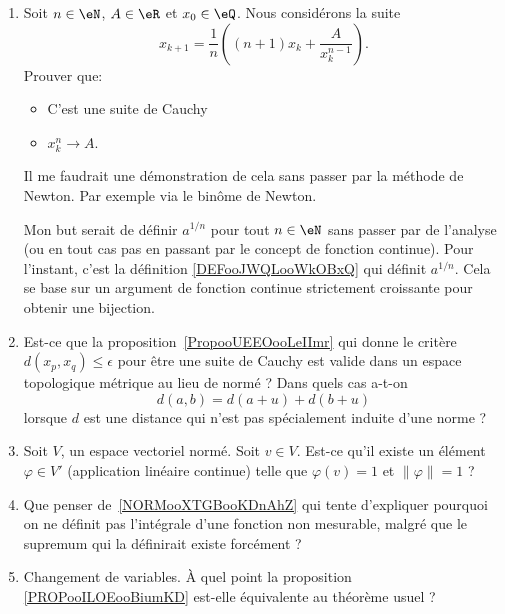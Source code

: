 \begin{enumerate}
    \item
        Soit \( n\in \eN\), \( A\in \eR\) et \( x_0\in \eQ\). Nous considérons la suite\cite{BIBooMPXEooQLKhku}
        \begin{equation}
            x_{k+1}=\frac{1}{ n }\left( (n+1)x_k+\frac{ A }{ x_k^{n-1} } \right).
        \end{equation}
        Prouver que:
        \begin{itemize}
            \item C'est une suite de Cauchy
            \item \( x_k^n\to A\).
        \end{itemize}
        Il me faudrait une démonstration de cela sans passer par la méthode de Newton. Par exemple via le binôme de Newton.

        Mon but serait de définir \( a^{1/n}\) pour tout \( n\in \eN\) sans passer par de l'analyse (ou en tout cas pas en passant par le concept de fonction continue). Pour l'instant, c'est la définition \ref{DEFooJWQLooWkOBxQ} qui définit \( a^{1/n}\). Cela se base sur un argument de fonction continue strictement croissante pour obtenir une bijection.
    \item
        Est-ce que la proposition~\ref{PropooUEEOooLeIImr} qui donne le critère \( d(x_p,x_q)\leq \epsilon\) pour être une suite de Cauchy est valide dans un espace topologique métrique au lieu de normé ?  Dans quels cas a-t-on
        \begin{equation}
            d(a,b)=d(a+u)+d(b+u)
        \end{equation}
        lorsque \( d\) est une distance qui n'est pas spécialement induite d'une norme ?
    \item
        Soit \( V\), un espace vectoriel normé. Soit \( v\in V\). Est-ce qu'il existe un élément \( \varphi\in V'\) (application linéaire continue) telle que \( \varphi(v)=1\) et \( \| \varphi \|=1\) ?
    \item
        Que penser de~\ref{NORMooXTGBooKDnAhZ} qui tente d'expliquer pourquoi on ne définit pas l'intégrale d'une fonction non mesurable, malgré que le supremum qui la définirait existe forcément ?
    \item
        Changement de variables. À quel point la proposition \ref{PROPooILOEooBiumKD} est-elle équivalente au théorème usuel ?
\end{enumerate}


